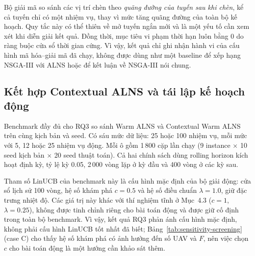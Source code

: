 \documentclass[11pt,a4paper]{article}
\begin{document}
Bộ giải mã so sánh các vị trí chèn theo \emph{quãng đường của tuyến sau khi chèn}, kể cả tuyến chỉ có một nhiệm vụ, thay vì mức tăng quãng đường của toàn bộ kế hoạch. Quy tắc này có thể thiên về mở tuyến ngắn mới và là một yếu tố cần xem xét khi diễn giải kết quả. Đồng thời, mục tiêu vi phạm thời hạn luôn bằng 0 do ràng buộc cửa sổ thời gian cứng. Vì vậy, kết quả chỉ ghi nhận hành vi của cấu hình mã hóa--giải mã đã chạy, không được dùng như một baseline để xếp hạng NSGA-III với ALNS hoặc để kết luận về NSGA-III nói chung.

\subsection{Kết hợp Contextual ALNS và tái lập kế hoạch động}
Benchmark đầy đủ cho RQ3 so sánh Warm ALNS và Contextual Warm ALNS trên cùng kịch bản và seed. Có sáu mức dữ liệu: 25 hoặc 100 nhiệm vụ, mỗi mức với 5, 12 hoặc 25 nhiệm vụ động. Mỗi ô gồm 1\,800 cặp lần chạy (9 instance $\times$ 10 seed kịch bản $\times$ 20 seed thuật toán). Cả hai chính sách dùng rolling horizon kích hoạt định kỳ, tỷ lệ kỳ 0.05, 2\,000 vòng lặp ở kỳ đầu và 400 vòng ở các kỳ sau.

Tham số LinUCB của benchmark này là cấu hình mặc định của bộ giải động: cửa sổ lịch sử 100 vòng, hệ số khám phá $c=0.5$ và hệ số điều chuẩn $\lambda=1.0$, giữ đặc trưng nhiệt độ. Các giá trị này khác với thí nghiệm tĩnh ở Mục~4.3 ($c=1$, $\lambda=0.25$), không được tinh chỉnh riêng cho bài toán động và được giữ cố định trong toàn bộ benchmark. Vì vậy, kết quả RQ3 phản ánh cấu hình mặc định, không phải cấu hình LinUCB tốt nhất đã biết; Bảng~\ref{tab:sensitivity-screening} (case C) cho thấy hệ số khám phá có ảnh hưởng đến số UAV và $F$, nên việc chọn $c$ cho bài toán động là một hướng cần khảo sát thêm.
\end{document}
